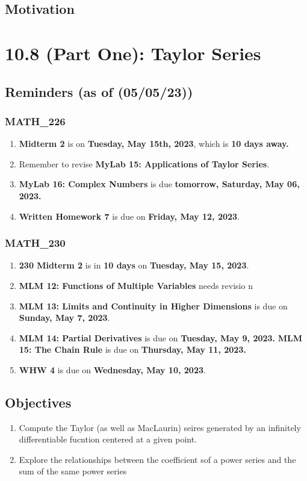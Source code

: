 \section{Motivation}
\chapter{10.8 (Part One): Taylor Series}
\section{Reminders (as of (05/05/23))}
\subsection{MATH\_226}
\begin{enumerate}
  \item  \textbf{Midterm 2} is on \textbf{Tuesday, May 15th, 2023}, which is \textbf{10 days away.}
  \item Remember to revise \textbf{MyLab 15:
        Applications of Taylor Series}.
  \item \textbf{MyLab 16: Complex Numbers} is
        due \textbf{tomorrow, Saturday, May 06, 2023.}
  \item \textbf{Written Homework 7} is due on
        \textbf{Friday, May 12, 2023}.
\end{enumerate}
\subsection{MATH\_230}
\begin{enumerate}
  \item \textbf{230 Midterm 2} is in \textbf{10 days} on
        \textbf{Tuesday, May 15, 2023}.
  \item \textbf{MLM 12: Functions of Multiple Variables} needs revisio n
  \item \textbf{MLM 13: Limits and Continuity in Higher
        Dimensions} is due on \textbf{Sunday, May 7, 2023}.
  \item \textbf{MLM 14: Partial Derivatives} is due on
        \textbf{Tuesday, May 9, 2023.}
        \textbf \textbf{MLM 15: The Chain Rule} is due on
        \textbf{Thursday, May 11, 2023.}
  \item \textbf{WHW 4} is due on \textbf{Wednesday,
        May 10, 2023}.

\end{enumerate}

\section{Objectives}
\begin{enumerate}
  \item Compute the Taylor (as well as MacLaurin) seires
        generated by an infinitely differentiable
        fucntion centered at a given point.
  \item Explore the relationships between the
        coefficient sof a power series and the sum of the
        same power series
\end{enumerate}

